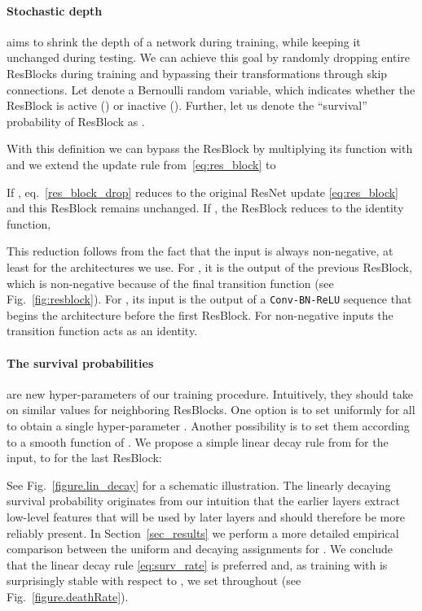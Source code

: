 \documentclass[runningheads]{llncs}
\begin{document}
\paragraph{\textbf{Stochastic depth}} aims to shrink the depth of a network during training, while keeping it unchanged during testing. We can achieve this goal by randomly dropping entire ResBlocks during training and bypassing their transformations through skip connections.
Let  denote a Bernoulli random variable, which indicates whether the  ResBlock is active () or inactive (). Further, let us denote the ``survival'' probability of ResBlock  as .

With this definition we can bypass the  ResBlock by multiplying its function  with  and we extend the update rule from~\eqref{eq:res_block} to

If , eq.~\eqref{res_block_drop} reduces to the original ResNet update \eqref{eq:res_block} and this ResBlock remains unchanged.
If , the ResBlock reduces to the identity function,

This reduction follows from the fact that the input  is always non-negative, at least for the architectures we use. For , it is the output of the previous ResBlock, which is non-negative because of the final  transition function (see Fig.~\ref{fig:resblock}). For , its input is the output of a {\tt Conv-BN-ReLU} sequence that begins the architecture before the first ResBlock. For non-negative inputs the  transition function acts as an identity.

\paragraph{\textbf{The survival probabilities}}  are new hyper-parameters of our training procedure. Intuitively, they should take on similar values for neighboring ResBlocks. One option is to set  uniformly for all  to obtain a single hyper-parameter . Another possibility is to set them according to a smooth function of . We propose a simple linear decay rule from  for the input, to  for the last ResBlock:

See Fig.~\ref{figure.lin_decay} for a schematic illustration.
The linearly decaying survival probability originates from our intuition that the earlier layers extract low-level features that will be used by later layers and should therefore be more reliably present.
In Section~\ref{sec_results} we perform a more detailed empirical comparison between the uniform and decaying assignments for .  We conclude that the linear decay rule \eqref{eq:surv_rate} is preferred and, as training with \name{} is surprisingly stable with respect to , we set  throughout (see Fig.~\ref{figure.deathRate}).
\end{document}
